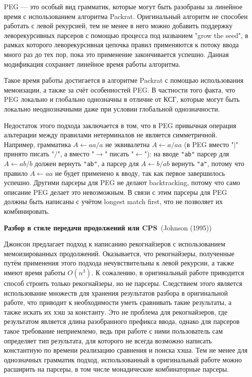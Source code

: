 \documentclass[times]{itmo-student-thesis}
\begin{document}
PEG --- это особый вид грамматик, которые могут быть разобраны за линейное время с использованием алгоритма
Packrat\cite{ford_parsing_nodate}. Оригинальный алгоритм не способен работать с левой рекурсией, тем не менее в него можно
добавить поддержку леворекурсивных парсеров с помощью процесса под названием "grow the seed"\cite{warth_packrat_2008}, в
рамках которого леворекурсивная цепочка правил применяются к потоку ввода много раз до тех пор, пока это применение
закончивается успешно. Данная модификация сохраняет линейное время работы алгоритма. 

Такое время работы достигается в алгоритме Packrat с помощью использования мемоизации, а также за счёт особенностей
PEG. В частности того факта, что PEG локально и глобально однозначны в отличие от КСГ, которые могут быть локально
неоднозначными даже при условии глобальной однозначности.

Недостаток этого подхода заключается в том, что в PEG привычная операция альтерации между правилами нетерминалов не
является симметричной. Например, грамматика $A \leftarrow aa / a$ не эквивалетна $A \leftarrow a / aa$ (в PEG вместо
"$|$"{} принято писать "$/$"{}, а вместо "$\to$"{} писать "$\leftarrow$"):
на вводе \lstinline{"ab"} парсер для $A \leftarrow ab / b$ должен вернуть \lstinline{"ab"}, а парсер для
$A \leftarrow b / ab$ вернуть \lstinline{"a"}, потому что правило $A \leftarrow aa$ не будет применено к вводу,
так как первое завершилось успешно. Другими парсеры для PEG не делают backtracking, потому что само описание PEG делает
это невозможным. В связи с этим парсеры для PEG должны быть написаны с учётом longest match first, что не позволяет их
комбинировать.

\textbf{Разбор в стиле передачи продолжений или CPS}~(Johnson (1995)\cite{johnson_memoization_nodate})

Джонсон предлагает подход к написанию рекогнайзеров с использованием мемоизированных продолжений. Оказывается, что
рекогнайзеры, полученные путём	применения этого подхода нечувствительны к левой рекурсии, а также имеют время работы
$O(n^3)$. К сожалению, в оригинальный работе приводится способ строить только рекогнайзеры, но не парсеры.
Следствием этого является использование множеств для хранения результатов разбора в оригинальной работе, что приводит к
необходимости уметь сравнивать такие результаты, а также искать их хэш за константу. Это не проблема для рекогнайзеров,
где результатом является длина разобранного префикса ввода, однако для парсеров такое требование неприемлемо, ведь при
работе с ними пользователь сам определяет тип результата, для которого не всегда возможно написать константную по
времени реализацию сравнения и поиска хэша. Тем не менее для однозначных грамматик подход, использованный в
оригинальный работе можно расширить на парсеры, в том числе монадические комбинаторные парсеры.
\end{document}
